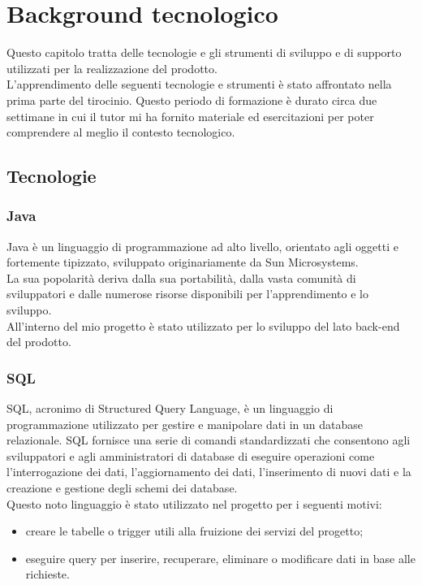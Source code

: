 \chapter{Background tecnologico}
\label{cap:tecnologie}

Questo capitolo tratta delle tecnologie e gli strumenti di sviluppo e di supporto utilizzati per la realizzazione del prodotto.\\ L'apprendimento delle seguenti tecnologie e strumenti è stato affrontato nella prima parte del tirocinio. Questo periodo di formazione è durato circa due settimane in cui il tutor mi ha fornito materiale ed esercitazioni per poter comprendere al meglio il contesto tecnologico.\\

\section{Tecnologie}
\subsection*{Java}
Java è un linguaggio di programmazione ad alto livello, orientato agli oggetti e fortemente tipizzato, sviluppato originariamente da Sun Microsystems.\\
La sua popolarità deriva dalla sua portabilità, dalla vasta comunità di sviluppatori e dalle numerose risorse disponibili per l'apprendimento e lo sviluppo.\\
All'interno del mio progetto è stato utilizzato per lo sviluppo del lato back-end del prodotto. 
\\

\subsection*{SQL}
SQL, acronimo di Structured Query Language, è un linguaggio di programmazione utilizzato per gestire e manipolare dati in un database relazionale. SQL fornisce una serie di comandi standardizzati che consentono agli sviluppatori e agli amministratori di database di eseguire operazioni come l'interrogazione dei dati, l'aggiornamento dei dati, l'inserimento di nuovi dati e la creazione e gestione degli schemi dei database.\\
Questo noto linguaggio è stato utilizzato nel progetto per i seguenti motivi:
\begin{itemize}
\item creare le tabelle o trigger utili alla fruizione dei servizi del progetto;
\item eseguire query per inserire, recuperare, eliminare o modificare dati in base alle richieste.
\end{itemize}

